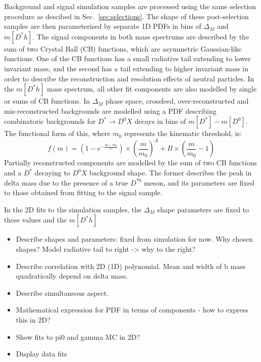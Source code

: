 \documentclass[oneside,12pt]{article}
\begin{document}
Background and signal simulation samples are processed using the same selection
procedure as descibed in Sec.~\ref{sec:selections}. The shape of these
post-selection samples are then parameterised by separate 1D PDFs in bins of
$\Delta_M$ and $m[D^*h]$. The signal components in both mass spectrums are
described by the sum of two Crystal Ball (CB) functions, which are asymmetric
Gaussian-like functions. One of the CB functions has a small radiative tail
extending to lower invariant mass, and the second has a tail extending to higher
invariant mass in order to describe the reconstruction and resolution effects of
neutral particles. In the $m[D^*h]$ mass spectrum, all other fit components are
also modelled by single or sums of CB functions. In $\Delta_M$ phase space,
crossfeed, over-reconstructed and mis-reconstructed backgrounds are modelled
using a PDF describing combinatoric backgrounds for $D^{*}\rightarrow D^{0}X$
decays in bins of $m[D^*]-m[D^0]$. The functional form of this, where $m_0$
represents the kinematic threshold, is:
\begin{equation}
f(m)=(1-e^{-\frac{m-m_0}{C}})\times(\frac{m}{m_0})^A+B\times(\frac{m}{m_0}-1)
\label{eq:DstD0BG}
\end{equation}
Partially reconstructed components are modelled by the sum of two CB
functions and a $D^*$ decaying to $D^0X$ background shape. The former describes
the peak in delta mass due to the presence of a true $D^{*0}$ meson, and its
parameters are fixed to those obtained from fitting to the signal sample.

In the 2D fits to the simulation samples, the $\Delta_M$ shape
parameters are fixed to these values and the $m[D^*h]$ 

\begin{itemize}
\item Describe shapes and parameters: fixed from simulation for now. Why chosen
shapes? Model radiative tail to right -> why to the right?
\item Describe correlation with 2D (1D) polynomial. Mean and width of b mass
quadratically depend on delta mass.
\item Describe simultaneous aspect.
\item Mathematical expression for PDF in terms of components - how to express
this in 2D?
\item Show fits to pi0 and gamma MC in 2D?
\\
\item Display data fits
\end{itemize}
\end{document}

